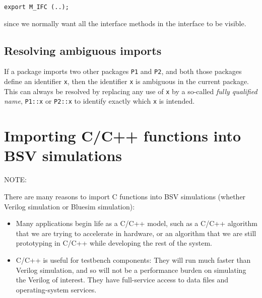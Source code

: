 \begin{center}
\mbox{\tt export M\_IFC (..);}
\end{center}

since we normally want all the interface methods in the interface to
be visible.


\subsection{Resolving ambiguous imports}


If a package imports two other packages \verb|P1| and \verb|P2|, and
both those packages define an identifier \verb|x|, then the identifier
\verb|x| is ambiguous in the current package.  This can always be
resolved by replacing any use of \verb|x| by a so-called \emph{fully
qualified name}, \verb|P1::x| or \verb|P2::x| to identify exactly
which \verb|x| is intended.


\section{Importing C/C++ functions into BSV simulations}


\vspace{2ex}

NOTE:

\vspace{1ex}

There are many reasons to import C functions into BSV simulations
(whether Verilog simulation or Bluesim simulation):

\begin{itemize}

 \item Many applications begin life as a C/C++ model, such as a C/C++
       algorithm that we are trying to accelerate in hardware, or an
       algorithm that we are still prototyping in C/C++ while
       developing the rest of the system.

 \item C/C++ is useful for testbench components: They will run much
       faster than Verilog simulation, and so will not be a
       performance burden on simulating the Verilog of interest.  They
       have full-service access to data files and operating-system
       services.

\end{itemize}

